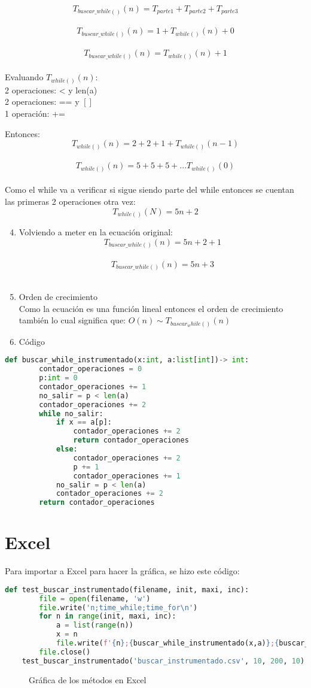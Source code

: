 \documentclass[stu, 12pt, letterpaper, donotrepeattitle, floatsintext, natbib, helv]{apa7}
\begin{document}
\[T_{buscar\_while()}(n) = T_{parte1} + T_{parte2} + T_{parte3} \] \\ 
\[T_{buscar\_while()}(n) = 1 + T_{while()}(n) + 0\] \\
\[T_{buscar\_while()}(n) = T_{while()}(n) + 1\] \\
Evaluando $T_{while()}(n)$: \\
2 operaciones: < y len(a) \\
2 operaciones: == y $[]$ \\
1 operación: +=

Entonces: \[T_{while()}(n) = 2 + 2 + 1 + T_{while()}(n-1)\] \\
\[T_{while()}(n) = 5 + 5 + 5 + ... T_{while()}(0)\] \\
Como el while va a verificar si sigue siendo parte del while entonces se cuentan las primeras 2 operaciones otra vez:
\[T_{while()}(N) = 5n + 2\]

\begin{enumerate}
    \setcounter{enumi}{3}
    \item Volviendo a meter en la ecuación original:
\[T_{buscar\_while()}(n) = 5n + 2 + 1\] \\
\[T_{buscar\_while()}(n) = 5n + 3\] \\
    \item Orden de crecimiento \\
Como la ecuación es una función lineal entonces el orden de crecimiento también lo cual significa que: $O(n) \sim T_{buscar_while()}(n)$
    \item Código
\end{enumerate}
\begin{lstlisting}[language=Python]
    def buscar_while_instrumentado(x:int, a:list[int])-> int:
        contador_operaciones = 0
        p:int = 0
        contador_operaciones += 1
        no_salir = p < len(a)
        contador_operaciones += 2
        while no_salir:
            if x == a[p]:
                contador_operaciones += 2
                return contador_operaciones
            else:
                contador_operaciones += 2
                p += 1
                contador_operaciones += 1
            no_salir = p < len(a)
            contador_operaciones += 2
        return contador_operaciones
\end{lstlisting}

\section{Excel}
Para importar a Excel para hacer la gráfica, se hizo este código:
{\scriptsize
\begin{lstlisting}[language=Python]
    def test_buscar_instrumentado(filename, init, maxi, inc):
        file = open(filename, 'w')
        file.write('n;time_while;time_for\n')
        for n in range(init, maxi, inc):
            a = list(range(n))
            x = n
            file.write(f'{n};{buscar_while_instrumentado(x,a)};{buscar_for_instrumentado(x,a)}\n')
        file.close()
    test_buscar_instrumentado('buscar_instrumentado.csv', 10, 200, 10)
\end{lstlisting}}

\begin{figure}[h]
    \centering
    \caption{Gráfica de los métodos en Excel}
    \label{fig:figureExcel1}
\end{figure}
\nocite{Clase21Mar}
\newpage
\renewcommand\refname{\large\textbf{Referencias}}

\end{document}
